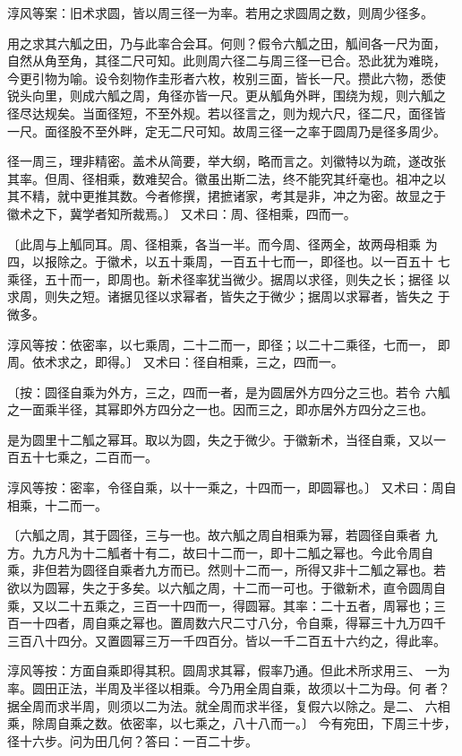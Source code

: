\documentclass[12pt,UTF8]{ctexbook}
\begin{document}
淳风等案：旧术求圆，皆以周三径一为率。若用之求圆周之数，则周少径多。

用之求其六觚之田，乃与此率合会耳。何则？假令六觚之田，觚间各一尺为面， 自然从角至角，其径二尺可知。此则周六径二与周三径一已合。恐此犹为难晓， 今更引物为喻。设令刻物作圭形者六枚，枚别三面，皆长一尺。攒此六物，悉使 锐头向里，则成六觚之周，角径亦皆一尺。更从觚角外畔，围绕为规，则六觚之 径尽达规矣。当面径短，不至外规。若以径言之，则为规六尺，径二尺，面径皆 一尺。面径股不至外畔，定无二尺可知。故周三径一之率于圆周乃是径多周少。

径一周三，理非精密。盖术从简要，举大纲，略而言之。刘徽特以为疏，遂改张 其率。但周、径相乘，数难契合。徽虽出斯二法，终不能究其纤毫也。祖冲之以 其不精，就中更推其数。今者修撰，捃摭诸家，考其是非，冲之为密。故显之于 徽术之下，冀学者知所裁焉。〕 又术曰：周、径相乘，四而一。

〔此周与上觚同耳。周、径相乘，各当一半。而今周、径两全，故两母相乘 为四，以报除之。于徽术，以五十乘周，一百五十七而一，即径也。以一百五十 七乘径，五十而一，即周也。新术径率犹当微少。据周以求径，则失之长；据径 以求周，则失之短。诸据见径以求幂者，皆失之于微少；据周以求幂者，皆失之 于微多。

淳风等按：依密率，以七乘周，二十二而一，即径；以二十二乘径，七而一， 即周。依术求之，即得。〕 又术曰：径自相乘，三之，四而一。

〔按：圆径自乘为外方，三之，四而一者，是为圆居外方四分之三也。若令 六觚之一面乘半径，其幂即外方四分之一也。因而三之，即亦居外方四分之三也。

是为圆里十二觚之幂耳。取以为圆，失之于微少。于徽新术，当径自乘，又以一 百五十七乘之，二百而一。

淳风等按：密率，令径自乘，以十一乘之，十四而一，即圆幂也。〕 又术曰：周自相乘，十二而一。

〔六觚之周，其于圆径，三与一也。故六觚之周自相乘为幂，若圆径自乘者 九方。九方凡为十二觚者十有二，故曰十二而一，即十二觚之幂也。今此令周自 乘，非但若为圆径自乘者九方而已。然则十二而一，所得又非十二觚之幂也。若 欲以为圆幂，失之于多矣。以六觚之周，十二而一可也。于徽新术，直令圆周自 乘，又以二十五乘之，三百一十四而一，得圆幂。其率：二十五者，周幂也；三 百一十四者，周自乘之幂也。置周数六尺二寸八分，令自乘，得幂三十九万四千 三百八十四分。又置圆幂三万一千四百分。皆以一千二百五十六约之，得此率。

淳风等按：方面自乘即得其积。圆周求其幂，假率乃通。但此术所求用三、 一为率。圆田正法，半周及半径以相乘。今乃用全周自乘，故须以十二为母。何 者？据全周而求半周，则须以二为法。就全周而求半径，复假六以除之。是二、 六相乘，除周自乘之数。依密率，以七乘之，八十八而一。〕 今有宛田，下周三十步，径十六步。问为田几何？答曰：一百二十步。
\end{document}
